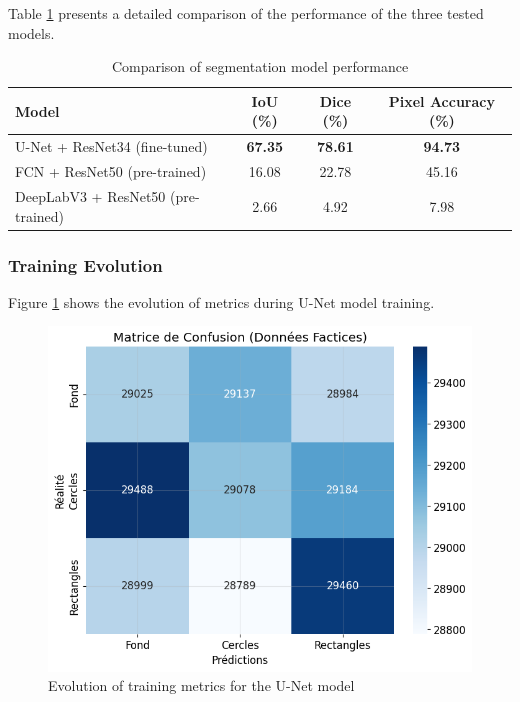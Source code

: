 \documentclass[12pt,a4paper]{article}
\begin{document}
Table \ref{tab:model_comparison} presents a detailed comparison of the performance of the three tested models.

\begin{table}[H]
\centering
\caption{Comparison of segmentation model performance}
\label{tab:model_comparison}
\begin{tabular}{@{}lccc@{}}
\toprule
\textbf{Model} & \textbf{IoU (\%)} & \textbf{Dice (\%)} & \textbf{Pixel Accuracy (\%)} \\
\midrule
U-Net + ResNet34 (fine-tuned) & \textbf{67.35} & \textbf{78.61} & \textbf{94.73} \\
FCN + ResNet50 (pre-trained) & 16.08 & 22.78 & 45.16 \\
DeepLabV3 + ResNet50 (pre-trained) & 2.66 & 4.92 & 7.98 \\
\bottomrule
\end{tabular}
\end{table}

\subsubsection{Training Evolution}

Figure \ref{fig:training_curves} shows the evolution of metrics during U-Net model training.

\begin{figure}[H]
    \centering
    \includegraphics[width=\textwidth]{img_tp1/cell_15_output_01_image_06.png}
    \caption{Evolution of training metrics for the U-Net model}
    \label{fig:training_curves}
\end{figure}
\end{document}
